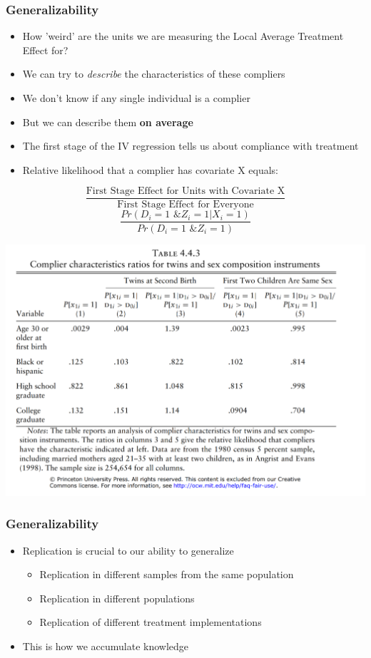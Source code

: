 \documentclass[xcolor=x11names,compress]{beamer}\usepackage[]{graphicx}\usepackage[]{color}
\renewcommand{\(}{\begin{columns}}
\renewcommand{\)}{\end{columns}}
\newcommand{\<}[1]{\begin{column}{#1}}
\renewcommand{\>}{\end{column}}
\begin{document}
\begin{frame}
\frametitle{Generalizability}
\begin{itemize}
\item How 'weird' are the units we are measuring the Local Average Treatment Effect for?
\pause
\item We can try to \textit{describe} the characteristics of these compliers
\pause
\item We don't know if any single individual is a complier
\pause
\item But we can describe them \textbf{on average}
\pause
\item The first stage of the IV regression tells us about compliance with treatment
\pause
\item Relative likelihood that a complier has covariate X equals:
\end{itemize}
\pause
$$\frac{\text{First Stage Effect for Units with Covariate X}}{\text{First Stage Effect for Everyone}}$$
\pause
$$\frac{Pr(D_i=1\text{ \& }Z_i=1 | X_i=1)}{Pr(D_i=1\text{ \& }Z_i=1)}$$
\end{frame}

\begin{frame}
\includegraphics[width=\linewidth]{twins_compliers.png}
\end{frame}

\begin{frame}
\frametitle{Generalizability}
\begin{itemize}
\item Replication is crucial to our ability to generalize
\pause
\begin{itemize}
\item Replication in different samples from the same population
\pause
\item Replication in different populations
\pause
\item Replication of different treatment implementations
\end{itemize}
\item This is how we accumulate knowledge
\end{itemize}
\end{frame}
\end{document}
